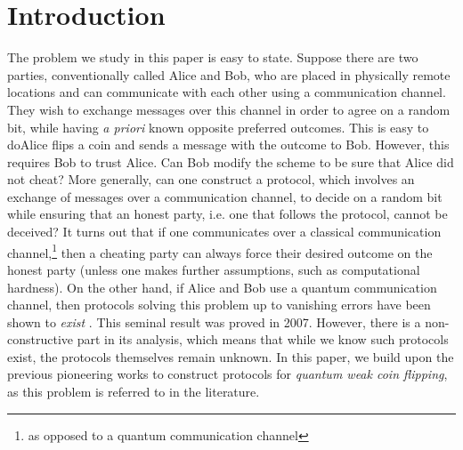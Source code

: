 \documentclass{article}
\begin{document}
\section{Introduction\label{sec:intro}}
The problem we study in this paper is easy to state. Suppose
there are two parties, conventionally called Alice and Bob, who are
placed in physically remote locations and can communicate with each
other using a communication channel. They wish to exchange messages
over this channel in order to agree on a random bit, while having \emph{a priori} known opposite preferred outcomes.
This is easy to do\textemdash Alice flips a coin and sends a message
with the outcome to Bob. However, this requires Bob to trust Alice. Can Bob modify
the scheme to be sure that Alice did not cheat? More generally, can
one construct a protocol, which involves an exchange of messages over
a communication channel, to decide on a random bit while ensuring
that an honest party, i.e. one that follows the protocol, cannot
be deceived? It turns out that if one communicates over a classical
communication channel,\footnote{as opposed to a quantum communication channel} then
a cheating party can always force their desired outcome on the honest
party (unless one makes further assumptions, such as computational hardness).
On the other hand, if Alice and Bob use a quantum
communication channel, then protocols solving this problem up to
vanishing errors have been shown to \emph{exist} \cite{Mochon07}. This seminal result was proved in
2007. However, there is a non-constructive part in its analysis, which means that while we know such protocols exist, the protocols themselves remain unknown.  %
%
In this paper, we build upon the previous
pioneering works to %
construct protocols for
\emph{quantum weak coin flipping}, as this problem is referred to in the literature.
\end{document}
